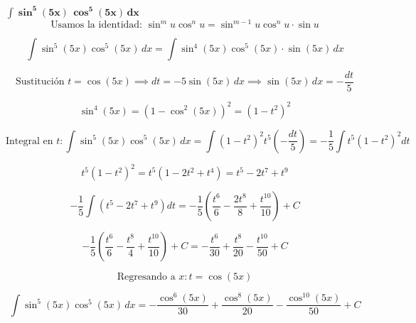 $\displaystyle \mathbf{\int \sin^{5}(5x)\,\cos^{5}(5x)\,dx}$
\nopagebreak
\[
\text{Usamos la identidad: } \sin^m u \cos^n u = \sin^{m-1} u \cos^n u \cdot \sin u
\]

\[
\int \sin^{5}(5x)\cos^{5}(5x)\,dx = \int \sin^{4}(5x)\cos^{5}(5x)\cdot \sin(5x)\, dx
\]

\[
\text{Sustitución } t = \cos(5x) \implies dt = -5 \sin(5x)\, dx \implies \sin(5x)\,dx = -\frac{dt}{5}
\]

\[
\sin^4(5x) = (1-\cos^2(5x))^2 = (1-t^2)^2
\]

\[
\text{Integral en } t:
\int \sin^5(5x)\cos^5(5x)\, dx = \int (1-t^2)^2 t^5 \left(-\frac{dt}{5}\right) = -\frac{1}{5} \int t^5 (1-t^2)^2 dt
\]

\[
t^5 (1-t^2)^2 = t^5 (1 - 2 t^2 + t^4) = t^5 - 2 t^7 + t^9
\]

\[
-\frac{1}{5} \int (t^5 - 2 t^7 + t^9) dt = -\frac{1}{5} \left( \frac{t^6}{6} - \frac{2 t^8}{8} + \frac{t^{10}}{10} \right) + C
\]

\[
-\frac{1}{5} \left( \frac{t^6}{6} - \frac{t^8}{4} + \frac{t^{10}}{10} \right) + C = -\frac{t^6}{30} + \frac{t^8}{20} - \frac{t^{10}}{50} + C
\]

\[
\text{Regresando a } x: t = \cos(5x)
\]

\[
\boxed{\displaystyle 
\int \sin^{5}(5x)\cos^{5}(5x)\,dx = -\frac{\cos^6(5x)}{30} + \frac{\cos^8(5x)}{20} - \frac{\cos^{10}(5x)}{50} + C
}
\]
